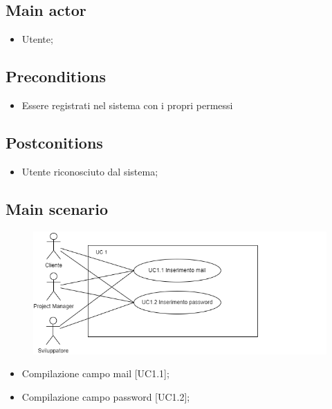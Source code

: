 \documentclass{article}
\begin{document}
     \subsection*{Main actor}
         \begin{itemize}
             \item Utente;
         \end{itemize}
     \subsection*{Preconditions} 
        \begin{itemize}
            \item Essere registrati nel sistema con i propri permessi
        \end{itemize}
               
    \subsection*{Postconitions}
        \begin{itemize}
            \item Utente riconosciuto dal sistema;
        \end{itemize}
    \subsection*{Main scenario}
        \begin{figure}[h]
            \centering
            \includegraphics{./imgUML/UC1-zoom.png}
            \label{fig:immagine}
        \end{figure}
            
        \begin{itemize}
            \item Compilazione campo mail [UC1.1];
            \item Compilazione campo password [UC1.2];
        \end{itemize}
            
\end{document}

